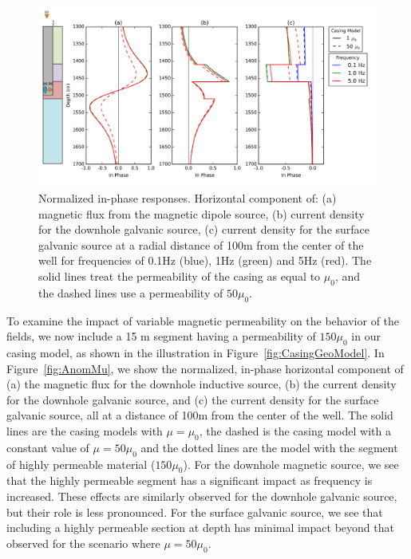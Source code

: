\documentclass{segabs}
\begin{document}
\begin{figure}[h!]
	\centering
	\includegraphics[width=1\columnwidth]{./Figures/VaryFreq}
	\caption{Normalized in-phase responses. Horizontal component of:  (a) magnetic flux from the magnetic dipole source, (b) current density for the downhole galvanic source, (c) current density for the surface galvanic source at a radial distance of 100m from the center of the well for frequencies of 0.1Hz (blue), 1Hz (green)  and 5Hz (red). The solid lines treat the permeability of the casing as equal to $\mu_0$, and the dashed lines use a permeability of $50 \mu_0$. }
	\label{fig:varyFreq}
\end{figure}
To examine the impact of variable magnetic permeability on the behavior of the fields, we now include a 15 m segment having a permeability of $150 \mu_0$ in our casing model, as shown in the illustration in Figure~\ref{fig:CasingGeoModel}. In Figure~\ref{fig:AnomMu}, we show the normalized, in-phase horizontal component of (a) the magnetic flux for the downhole inductive source, (b) the current density for the downhole galvanic source, and (c) the current density for the surface galvanic source, all at a distance of 100m from the center of the well. The solid lines are the casing models with $\mu = \mu_0$, the dashed is the casing model with a constant value of $\mu = 50 \mu_0$ and the dotted lines are the model with the segment of highly permeable material ($150 \mu_0$). For the downhole magnetic source, we see that the highly permeable segment has a significant impact as frequency is increased. These effects are similarly observed for the downhole galvanic source, but their role is less pronounced. For the surface galvanic source, we see that including a highly permeable section at depth has minimal impact beyond that observed for the scenario where $\mu = 50\mu_0$. 
\end{document}

